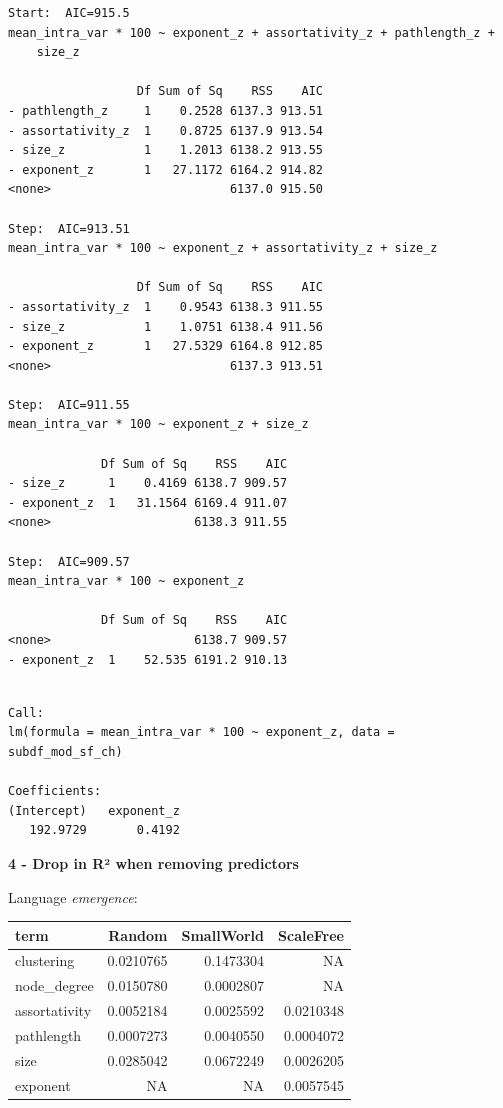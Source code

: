 \documentclass[
]{article}
\begin{document}
\begin{verbatim}
Start:  AIC=915.5
mean_intra_var * 100 ~ exponent_z + assortativity_z + pathlength_z + 
    size_z

                  Df Sum of Sq    RSS    AIC
- pathlength_z     1    0.2528 6137.3 913.51
- assortativity_z  1    0.8725 6137.9 913.54
- size_z           1    1.2013 6138.2 913.55
- exponent_z       1   27.1172 6164.2 914.82
<none>                         6137.0 915.50

Step:  AIC=913.51
mean_intra_var * 100 ~ exponent_z + assortativity_z + size_z

                  Df Sum of Sq    RSS    AIC
- assortativity_z  1    0.9543 6138.3 911.55
- size_z           1    1.0751 6138.4 911.56
- exponent_z       1   27.5329 6164.8 912.85
<none>                         6137.3 913.51

Step:  AIC=911.55
mean_intra_var * 100 ~ exponent_z + size_z

             Df Sum of Sq    RSS    AIC
- size_z      1    0.4169 6138.7 909.57
- exponent_z  1   31.1564 6169.4 911.07
<none>                    6138.3 911.55

Step:  AIC=909.57
mean_intra_var * 100 ~ exponent_z

             Df Sum of Sq    RSS    AIC
<none>                    6138.7 909.57
- exponent_z  1    52.535 6191.2 910.13
\end{verbatim}

\begin{verbatim}

Call:
lm(formula = mean_intra_var * 100 ~ exponent_z, data = subdf_mod_sf_ch)

Coefficients:
(Intercept)   exponent_z  
   192.9729       0.4192  
\end{verbatim}

\textbf{4 - Drop in R² when removing predictors}

Language \emph{emergence}:

\begin{longtable}[]{@{}lrrr@{}}
\toprule()
term & Random & SmallWorld & ScaleFree \\
\midrule()
\endhead
clustering & 0.0210765 & 0.1473304 & NA \\
node\_degree & 0.0150780 & 0.0002807 & NA \\
assortativity & 0.0052184 & 0.0025592 & 0.0210348 \\
pathlength & 0.0007273 & 0.0040550 & 0.0004072 \\
size & 0.0285042 & 0.0672249 & 0.0026205 \\
exponent & NA & NA & 0.0057545 \\
\bottomrule()
\end{longtable}
\end{document}
